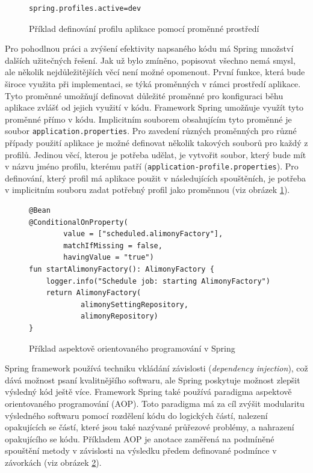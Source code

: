         \begin{figure}
            \begin{verbatim}
spring.profiles.active=dev
            \end{verbatim}
            \caption{Příklad definování profilu aplikace pomocí proměnné prostředí} 
            \label{code:current-spring-profile}
        \end{figure}
        Pro pohodlnou práci a zvýšení efektivity napsaného kódu má Spring množství dalších užitečných řešení. Jak už bylo zmíněno, popisovat všechno nemá smysl, ale několik nejdůležitějších věcí není možné opomenout. První funkce, která bude široce využita při implementaci, se týká proměnných v rámci prostředí aplikace. Tyto proměnné umožňují definovat důležité proměnné pro konfiguraci běhu aplikace zvlášť od jejich využití v kódu. Framework Spring umožňuje využít tyto proměnné přímo v kódu. Implicitním souborem obsahujícím tyto proměnné je soubor \texttt{application.properties}. Pro zavedení různých proměnných pro různé případy použití aplikace je možné definovat několik takových souborů pro každý z profilů. Jedinou věcí, kterou je potřeba udělat, je vytvořit soubor, který bude mít v názvu jméno profilu, kterému patří (\texttt{application-{profile}.properties}). Pro definování, který profil má aplikace použit v následujících spouštěních, je potřeba v implicitním souboru zadat potřebný profil jako proměnnou (viz obrázek \ref{code:current-spring-profile}). 
        
        
        \begin{figure}
            \begin{verbatim}
@Bean
@ConditionalOnProperty(
        value = ["scheduled.alimonyFactory"],
        matchIfMissing = false,
        havingValue = "true")
fun startAlimonyFactory(): AlimonyFactory {
    logger.info("Schedule job: starting AlimonyFactory")
    return AlimonyFactory(
            alimonySettingRepository,
            alimonyRepository)
}
            \end{verbatim}
            \caption{Příklad aspektově orientovaného programování v Spring} 
            \label{code:spring-conditional}
        \end{figure}
        Spring framework používá techniku vkládání závislosti (\textit{dependency injection}), což dává možnost psaní kvalitnějšího softwaru, ale Spring poskytuje možnost zlepšit výsledný kód ještě více. Framework Spring také používá paradigma aspektově orientovaného programování (AOP). Toto paradigma má za cíl zvýšit modularitu výsledného softwaru pomocí rozdělení kódu do logických částí, nalezení opakujících se částí, které jsou také nazývané průřezové problémy, a nahrazení opakujícího se kódu. Příkladem AOP je anotace zaměřená na podmíněné spouštění metody v závislosti na výsledku předem definované podmínce v závorkách (viz obrázek \ref{code:spring-conditional}).
    
